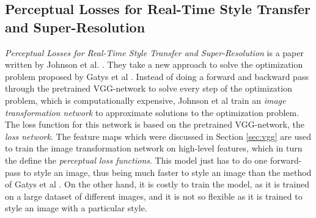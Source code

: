 \subsection{Perceptual Losses for Real-Time Style Transfer and Super-Resolution}
\label{seq:johnson}
\textit{Perceptual Losses for Real-Time Style Transfer and Super-Resolution} is a paper written by Johnson et al. \cite{Johnson:1}. They take a new approach to solve the optimization problem proposed by Gatys et al \cite{Gatys:1}. Instead of doing a forward and backward pass through the pretrained VGG-network to solve every step of the optimization problem, which is computationally expensive, Johnson et al train an \textit{image transformation network} to approximate solutions to the optimization problem. The loss function for this network is based on the pretrained VGG-network, the \textit{loss network}. The feature maps which were discussed in Section \ref{sec:vgg} are used to train the image transformation network on high-level features, which in turn the define the \textit{perceptual loss functions}. This model just has to do one forward-pass to style an image, thus being much faster to style an image than the method of Gatys et al \cite{Gatys:1}. On the other hand, it is costly to train the model, as it is trained on a large dataset of different images, and it is not so flexible as it is trained to style an image with a particular style.
